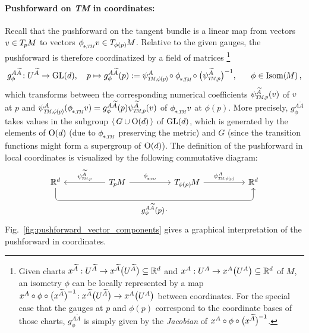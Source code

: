 \paragraph{Pushforward on \textit{TM} in coordinates:}
Recall that the pushforward on the tangent bundle is a linear map from vectors $v\in T_{\mkern-1.5mu p}\mkern-.5muM$ to vectors $\dphiTM v \in \TphipM$.
Relative to the given gauges, the pushforward is therefore coordinatized by a field of matrices%
\footnote{
    Given charts
    $x^{\widetilde{A}}: U^{\widetilde{A}} \to x^{\widetilde{A}}\big(U^{\widetilde{A}}\big) \subseteq \mathbb{R}^d$
    and
    $x^A: U^A \to x^A\big(U^A\big) \subseteq \mathbb{R}^d$
    of $M$, an isometry $\phi$ can be locally represented by a map
    $x^A \circ \phi \circ \big(x^{\widetilde{A}}\big)^{\mkern-1mu-1}\!: x^{\widetilde{A}}\big(U^{\widetilde{A}}\big) \to x^A\big(U^A\big)$
    between coordinates.
    For the special case that the gauges at $p$ and $\phi(p)$ correspond to the coordinate bases of those charts, $g_\phi^{A\widetilde{A}}$ is simply given by the \emph{Jacobian} of $x^A \circ \phi \circ \big(x^{\widetilde{A}}\big)^{\mkern-1mu-1}$.
}
\begin{align}\label{eq:pushforward_TM_coord}
    g_\phi^{A\widetilde{A}}\!: U^{\widetilde{A}} \to \GL{d},\ \ \ 
    p \mapsto g_\phi^{A\widetilde{A}}(p) := \psiTMphip^A \mkern-2mu\circ \dphiTM \mkern-2mu\circ \big(\psiTMp^{\widetilde{A}}\big)^{-1}
    , \quad\ \ \phi \in \IsomM \,,
\end{align}
which transforms between the corresponding numerical coefficients $\psiTMp^{\widetilde{A}}(v)$ of $v$ at $p$ and $\psiTMphip^A(\dphiTM v) = g_\phi^{A\widetilde{A}}(p) \psiTMp^{\widetilde{A}}(v)$ of $\dphiTM v$ at $\phi(p)$.
More precisely, $g_\phi^{A\widetilde{A}}$ takes values in the subgroup $\langle\, G\cup\operatorname{O}(d) \,\rangle$ of $\operatorname{GL}(d)$, which is generated by the elements of $\operatorname{O}(d)$ (due to $\dphiTM$ preserving the metric) and $G$ (since the transition functions might form a supergroup of $\operatorname{O}(d)$).
The definition of the pushforward in local coordinates is visualized by the following commutative diagram:
\begin{equation}\label{cd:pushforward_TM_coord}
    \begin{tikzcd}[row sep=4.em, column sep=5em]
        \R^d
            \arrow[rrr, pos=.5, rounded corners, to path={ 
                    -- ([yshift=-3.5ex]\tikztostart.south) 
                    --node[below]{\small$
                        g_\phi^{A\widetilde{A}}(p) \mkern2mu\cdot
                        $} ([yshift=-3.5ex]\tikztotarget.south) 
                    -- (\tikztotarget.south)
                    }]
        &
        \TpM
            \arrow[l, "\psiTMp^{\widetilde{A}}"']
            \arrow[r, "\dphiTM"]
        &
        \TphipM
            \arrow[r, "\psiTMphip^A"]
        &
        \R^d
    \end{tikzcd}
\end{equation}
Fig.~\ref{fig:pushforward_vector_components} gives a graphical interpretation of the pushforward in coordinates.



